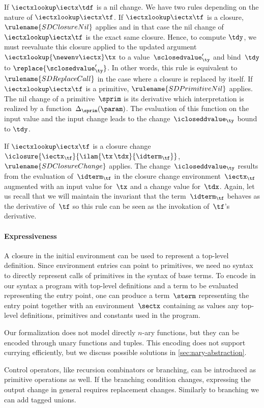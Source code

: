 If $\iectxlookup\iectx\tdf$ is a nil change. We have two rules
depending on the nature of $\iectxlookup\iectx\tf$. If
$\iectxlookup\iectx\tf$ is a closure, $\rulename{SDClosureNil}$
applies and in that case the nil change of~$\iectxlookup\iectx\tf$ is
the exact same closure. Hence, to compute $\tdy$, we must reevaluate
this closure applied to the updated
argument~$\iectxlookup{\newenv\iectx}\tx$ to a
value~$\sclosedvalue'_\ty$ and bind~$\tdy$ to
$\replace{\sclosedvalue'_\ty}$. In other words, this rule is
equivalent to $\rulename{SDReplaceCall}$ in the case where a closure
is replaced by itself.
%
If $\iectxlookup\iectx\tf$ is a primitive, $\rulename{SDPrimitiveNil}$
applies. The nil change of a primitive~$\sprim$ is its derivative
which interpretation is realized by a
function~$\Delta_\sprim(\param)$.  The evaluation of this function on
the input value and the input change leads to the
change~$\icloseddvalue_\ty$ bound to $\tdy$.

If $\iectxlookup\iectx\tf$ is a closure change
$\iclosure{\iectx_\tf}{\ilam{\tx\,\tdx}{\idterm_\tf}}$,
$\rulename{SDClosureChange}$ applies. The
change~$\icloseddvalue_\ty$ results from the evaluation
of~$\idterm_\tf$ in the closure change environment~$\iectx_\tf$
augmented with an input value for~$\tx$ and a change value
for~$\tdx$. Again, let us recall that we will maintain the
invariant that the term~$\idterm_\tf$ behaves as the derivative
of~$\tf$ so this rule can be seen as the invokation of~$\tf$'s
derivative.

\paragraph{Expressiveness}

A closure in the initial environment can be used to represent a
top-level definition. Since environment entries can point to
primitives, we need no syntax to directly represent calls of
primitives in the syntax of base terms. To encode in our syntax a
program with top-level definitions and a term to be evaluated
representing the entry point, one can produce a term~$\sterm$
representing the entry point together with an environment~$\sectx$
containing as values any top-level definitions, primitives and
constants used in the program.

Our formalization does not model directly $n$-ary functions, but they can be
encoded through unary functions and tuples. This encoding does not support
currying efficiently, but we discuss possible solutions in
\cref{sec:nary-abstraction}.

Control operators, like recursion combinators or branching, can be
introduced as primitive operations as well. If the branching condition changes,
expressing the output change in general requires replacement changes. Similarly
to branching we can add tagged unions.
